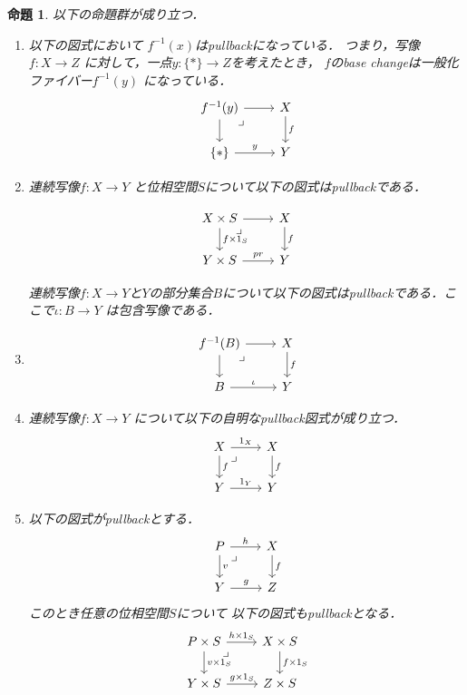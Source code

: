 \documentclass[leqno, a4paper, 12pt, dvipdfmx]{jsarticle}
\newtheorem{prop}[thm]{命題}
\begin{document}
\begin{prop}\label{prop:hom}
以下の命題群が成り立つ．
\begin{enumerate}[label=\textup{(A\arabic*)}]
\item\label{item:onpt}
以下の図式において
$f^{-1}(x)$はpullbackになっている．
つまり，写像$f\colon X\to Z$
に対して，一点$y\colon \{*\}\to Z$を考えたとき，
$f$のbase changeは一般化ファイバー$f^{-1}(y)$
になっている．
\[
\begin{tikzcd}
f^{-1}(y) \arrow[r] \arrow[d] \arrow[dr, phantom, "\lrcorner", very near start]
& X \arrow[d,"f"] \\
\{*\} \arrow[r,"y"] & Y
\end{tikzcd}
\]

\item\label{item:times}

連続写像$f\colon X\to Y$
と位相空間$S$について以下の図式はpullbackである．

\[
\begin{tikzcd}
X\times S \arrow[r] \arrow[d, "f\times 1_{S}"] \arrow[dr, phantom, "\lrcorner", very near start]
& X \arrow[d,"f"] \\
Y\times S \arrow[r,"pr"] & Y
\end{tikzcd}
\]

連続写像$f\colon X\to Y$と$Y$の部分集合$B$について以下の図式はpullbackである．ここで$\iota\colon B\to Y$
は包含写像である．

\item\label{item:preim}
\[
\begin{tikzcd}
f^{-1}(B) \arrow[r] \arrow[d] \arrow[dr, phantom, "\lrcorner", very near start]
& X \arrow[d,"f"] \\
B \arrow[r,"\iota"] & Y
\end{tikzcd}
\]


\item\label{item:jimei}
連続写像$f\colon X\to Y$
について以下の自明なpullback図式が成り立つ．
\[
\begin{tikzcd}
X \arrow[r, "1_{X}"] \arrow[d, "f"] \arrow[dr, phantom, "\lrcorner", very near start]
& X \arrow[d,"f"] \\
Y \arrow[r,"1_{Y}"] & Y
\end{tikzcd}
\]


\item\label{item:times2}
以下の図式がpullbackとする．
\[
\begin{tikzcd}
P \arrow[r, "h"] \arrow[d, "v"] \arrow[dr, phantom, "\lrcorner", very near start]
& X \arrow[d,"f"] \\
Y \arrow[r,"g"] & Z
\end{tikzcd}
\]
このとき任意の位相空間$S$について
以下の図式もpullbackとなる．
\[
\begin{tikzcd}
P \times S\arrow[r, "h\times 1_{S}"] \arrow[d, "v\times 1_{S}"] \arrow[dr, phantom, "\lrcorner", very near start]
& X \times S\arrow[d,"f\times 1_{S}"] \\
Y \times S\arrow[r,"g\times 1_{S}"] & Z\times S
\end{tikzcd}
\]



\end{enumerate}

\end{prop}
\end{document}
